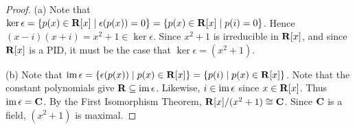 \documentclass[10pt,twoside,openany]{memoir}
\begin{document}
    {\color{blue} \begin{proof}
        (a) Note that $\ker \epsilon = \{p(x) \in \mathbf{R}[x] \mid \epsilon(p(x)) = 0\} = \{p(x) \in \mathbf{R}[x] \mid p(i) = 0\}$. Hence $(x-i)(x+i) = x^2 +1 \in \ker \epsilon$. Since $x^2 + 1$ is irreducible in $\mathbf{R}[x]$, and since $\mathbf{R}[x]$ is a PID, it must be the case that $\ker \epsilon = (x^2 + 1)$.

        (b) Note that $\operatorname{im} \epsilon = \{\epsilon(p(x)) \mid p(x) \in \mathbf{R}[x]\} = \{p(i) \mid p(x) \in \mathbf{R}[x]\}$. Note that the constant polynomials give $\mathbf{R} \subseteq \operatorname{im} \epsilon$. Likewise, $i \in \operatorname{im} \epsilon$ since $x \in \mathbf{R}[x]$. Thus $\operatorname{im} \epsilon = \mathbf{C}$. By the First Isomorphism Theorem, $\mathbf{R}[x]/(x^2 + 1) \cong \mathbf{C}$. Since $\mathbf{C}$ is a field, $(x^2+1)$ is maximal. 
    \end{proof}}

\end{document}
